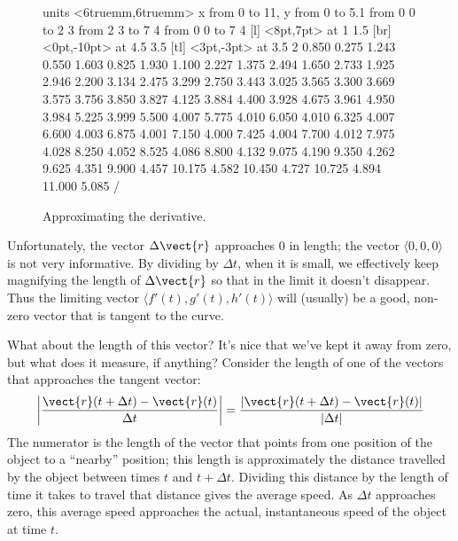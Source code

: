 \begin{figure}[H]
\centerline{
\vbox{\beginpicture
\normalgraphs
\setcoordinatesystem units <6truemm,6truemm>
\setplotarea x from 0 to 11, y from 0 to 5.1
\arrow <5pt> [0.17, 0.5] from 0 0 to 2 3
\arrow <5pt> [0.17, 0.5] from 2 3 to 7 4
\arrow <5pt> [0.17, 0.5] from 0 0 to 7 4
 [l] <8pt,7pt> at 1 1.5
 [br] <0pt,-10pt> at 4.5 3.5
 [tl]
  <3pt,-3pt> at 3.5 2
\setquadratic
 0.850 0.275 1.243 0.550 1.603 0.825 1.930 1.100 2.227 
1.375 2.494 1.650 2.733 1.925 2.946 2.200 3.134 2.475 3.299 
2.750 3.443 3.025 3.565 3.300 3.669 3.575 3.756 3.850 3.827 
4.125 3.884 4.400 3.928 4.675 3.961 4.950 3.984 5.225 3.999 
5.500 4.007 5.775 4.010 6.050 4.010 6.325 4.007 6.600 4.003 
6.875 4.001 7.150 4.000 7.425 4.004 7.700 4.012 7.975 4.028 
8.250 4.052 8.525 4.086 8.800 4.132 9.075 4.190 9.350 4.262 
9.625 4.351 9.900 4.457 10.175 4.582 10.450 4.727 10.725 4.894 
11.000 5.085 /
\endpicture}}
\caption{Approximating the derivative. \label{fig:vector derivative}}
\end{figure}

Unfortunately, the vector $\Delta\vect{r}$ approaches 0 in length; the
vector $\langle 0,0,0\rangle$ is not very informative. By dividing by
$\Delta t$, when it is small, we effectively keep magnifying the
length of $\Delta\vect{r}$ so that in the limit it doesn't disappear. Thus the
limiting vector $\langle f'(t),g'(t),h'(t)\rangle$ will (usually) be a
good, non-zero vector that is tangent to the curve.

What about the length of this vector? It's nice that we've kept it
away from zero, but what does it measure, if anything?
Consider the length of one of the vectors that approaches the tangent
vector:
$$\left|{\vect{r}(t+\Delta t)-\vect{r}(t)\over
\Delta t}\right|={|\vect{r}(t+\Delta t)-\vect{r}(t)|\over|\Delta t|}$$
The numerator is the length of the vector that points from one position
of the object to a ``nearby'' position; this length is approximately
the distance travelled by the object between times $t$ and $t+\Delta
t$. Dividing this distance by the length of time it takes to travel
that distance gives the average speed. As $\Delta t$ approaches zero,
this average speed approaches the actual, instantaneous speed of the
object at time $t$. 

